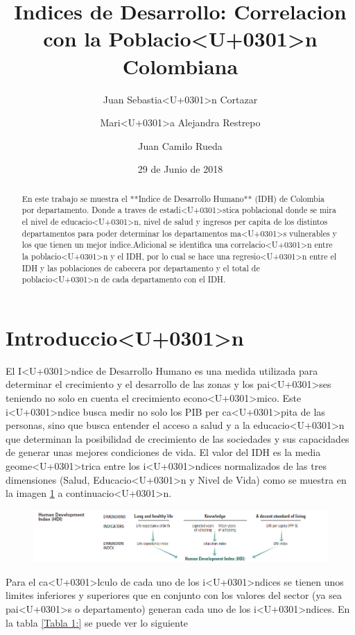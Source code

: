 \documentclass{article}
\title{Indices de Desarrollo: Correlacion con la Poblacio<U+0301>n Colombiana}
\author[1]{\normalsize Juan Sebastia<U+0301>n Cortazar}
\author[2]{\normalsize Mari<U+0301>a Alejandra Restrepo}
\author[3]{\normalsize Juan Camilo Rueda}
\affil[1,2,3]{\small  Universidad de los Andes\\
\texttt{{js.cortazar533,ma.restrepot,jc.rueda169}@uniandes.edu.col}}
\date{29 de Junio de 2018}
\begin{document}


\maketitle


\begin{abstract}
En este trabajo se muestra el **Indice de Desarrollo Humano** (IDH) de Colombia por departamento. Donde a traves de estadi<U+0301>stica poblacional donde se mira el nivel de educacio<U+0301>n, nivel de salud y ingresos per capita de los distintos departamentos para poder determinar los departamentos ma<U+0301>s vulnerables y los que tienen un mejor indice.Adicional se identifica una correlacio<U+0301>n entre la poblacio<U+0301>n y el IDH, por lo cual se hace una regresio<U+0301>n entre el IDH y las poblaciones de cabecera por departamento y el total de poblacio<U+0301>n de cada departamento con el IDH. 
\end{abstract}

\section*{Introduccio<U+0301>n}

El I<U+0301>ndice de Desarrollo Humano es una medida utilizada para determinar el crecimiento y el desarrollo de las zonas y los pai<U+0301>ses teniendo no solo en cuenta el crecimiento econo<U+0301>mico. Este i<U+0301>ndice busca medir no solo los PIB per ca<U+0301>pita de las personas, sino que busca entender el acceso a salud y a la educacio<U+0301>n que determinan la posibilidad de crecimiento de las sociedades y sus capacidades de generar unas mejores condiciones de vida. 
El valor del IDH es la media geome<U+0301>trica entre los i<U+0301>ndices normalizados de las tres dimensiones (Salud, Educacio<U+0301>n y Nivel de Vida) como se muestra en la imagen \ref{IDH} a continuacio<U+0301>n. 


\begin{figure}[h]
\centering
\includegraphics{hdiCalc}
\label {IDH}
\end{figure}

Para el ca<U+0301>lculo de cada uno de los i<U+0301>ndices se tienen unos limites inferiores y superiores que en conjunto con los valores del sector (ya sea pai<U+0301>s o departamento) generan cada uno de los i<U+0301>ndices. En la tabla \ref{Tabla 1:} se puede ver lo siguiente
\end{document}

